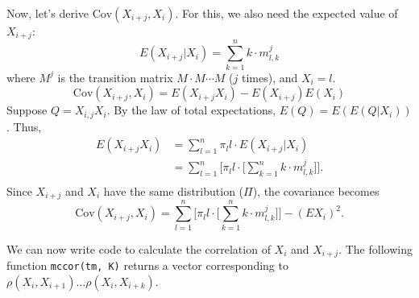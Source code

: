 \documentclass[letter]{article}
\begin{document}
Now, let's derive $\text{Cov}(X_{i+j}, X_i)$. For this, we also need the expected
value of $X_{i+j}$:
$$ E(X_{i+j} | X_i) = \sum_{k=1}^n{k \cdot m^j_{l,k}} $$
where $M^j$ is the transition matrix $M \cdot M \cdots M$ ($j$ times), and 
$X_i = l$. 
$$ \text{Cov}(X_{i+j}, X_i) = E(X_{i+j}X_i) - E(X_{i+j})E(X_i) $$
Suppose $Q = X_{i,j}X_i$. By the law of total expectations, $ E(Q) = E(E(Q|X_i))$.
Thus, 
\begin{equation*}
  \begin{aligned}
    E(X_{i+j}X_i) &= \sum_{l=1}^n{ \pi_l l \cdot E(X_{i+j} | X_i)} \\
                  &= \sum_{l=1}^n{ \Bigg[ \pi_l l \cdot \Big[ 
                         \sum_{k=1}^n{k \cdot m^j_{l,k}} \Big]} \Bigg]. \\
  \end{aligned}
\end{equation*}
Since $X_{i+j}$ and $X_i$ have the same distribution ($\Pi$), the covariance becomes
$$ \text{Cov}(X_{i+j}, X_i) =  \sum_{l=1}^n{ \Bigg[ \pi_l l \cdot \Big[ 
                                     \sum_{k=1}^n{k \cdot m^j_{l,k}} \Big]} \Bigg]
                              - (EX_i)^2.$$

We can now write code to calculate the correlation of $X_i$ and $X_{i+j}$. The following
function \texttt{mccor(tm, K)} returns a vector corresponding to 
$\rho(X_i, X_{i+1}) \dots \rho(X_i, X_{i+k})$. 

\lstset{
  basicstyle=\small,
  stringstyle=\ttfamily,
  numbers=left,
  numberstyle=\tiny,
  stepnumber=1, 
  numbersep=5pt,
  language=R }


\end{document}
